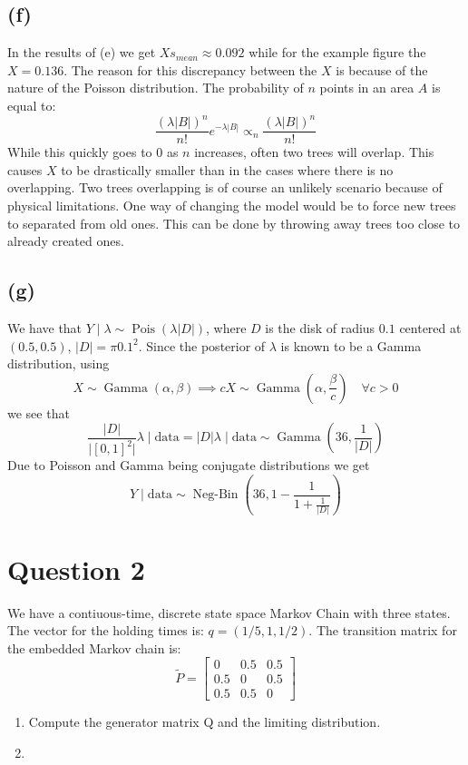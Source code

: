 \documentclass{article}
\DeclareMathOperator\Poisson{Pois}
\DeclareMathOperator\GammaDist{Gamma}
\DeclareMathOperator\NegBin{Neg-Bin}
\newcommand{\size}[1]{\lvert #1 \rvert}
\begin{document}
\subsection{(f)}
In the results of (e) we get $Xs_{mean} \approx 0.092$ while for the example figure the $X = 0.136$.
The reason for this discrepancy between the $X$ is because of the nature of the Poisson distribution.
The probability of $n$ points in an area $A$ is equal to: 
$$\frac{(\lambda |B|)^n}{n!}e^{-\lambda|B|} \propto_n \frac{(\lambda |B|)^n}{n!}$$
While this quickly goes to $0$ as $n$ increases, often two trees will overlap.
This causes $X$ to be drastically smaller than in the cases where there is no overlapping. 
Two trees overlapping is of course an unlikely scenario because of physical limitations.
One way of changing the model would be to force new trees to separated from old ones.
This can be done by throwing away trees too close to already created ones.

\subsection{(g)}
We have that $Y \mid \lambda \sim \Poisson(\lambda \lvert D \rvert)$,
where $D$ is the disk of radius $0.1$ centered at $(0.5, 0.5)$,
$\lvert D \rvert = \pi 0.1^2$.
Since the posterior of $\lambda$ is known to be a Gamma distribution, using
$$ X \sim \GammaDist(\alpha, \beta) \implies cX \sim \GammaDist(\alpha, \frac\beta c) \quad \forall c>0 $$
we see that
$$ \frac{\size{D}}{\size{[0, 1]^2}} \lambda \mid \text{data} = \size{D} \lambda \mid \text{data}
\sim \GammaDist(36, \frac1{\size{D}}) $$
Due to Poisson and Gamma being conjugate distributions we get
$$ Y \mid \text{data} \sim \NegBin(36, 1 - \frac1{1 + \frac1{\size{D}}}) $$

\section{Question 2}
We have a contiuous-time, discrete state space Markov Chain with three states.
The vector for the holding times is: $q = (1/5, 1, 1/2)$.
The transition matrix for the embedded Markov chain is:
$$ \tilde{P} = \begin{bmatrix}
0 & 0.5 & 0.5\\
0.5 & 0 & 0.5\\
0.5 & 0.5 & 0
\end{bmatrix} $$
\begin{enumerate}[label=(\alph*)]
	\item Compute the generator matrix Q and the limiting distribution.
	\item
\end{enumerate}
\end{document}
